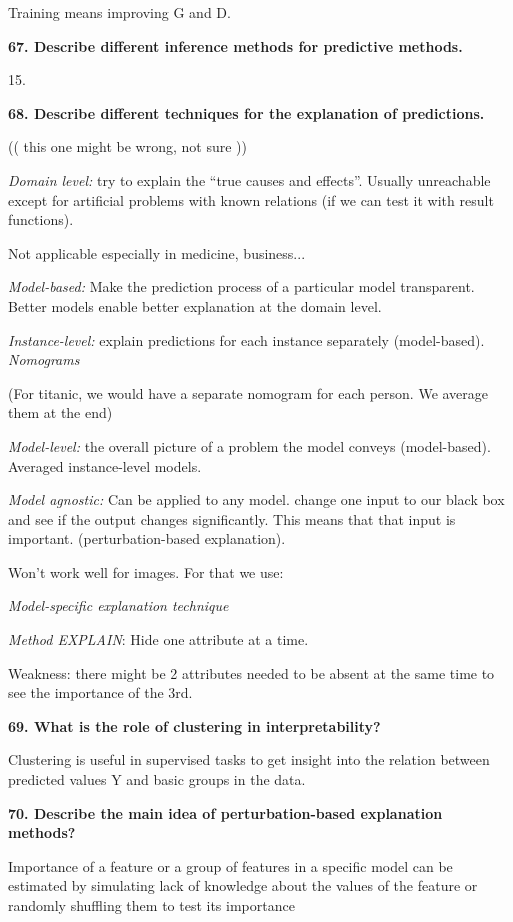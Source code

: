 Training means improving G and D.

\textbf{67. Describe different inference methods for predictive
methods.}

15.

\textbf{68. Describe different techniques for the explanation of
predictions.}

(( this one might be wrong, not sure ))

\textit{Domain level:} try to explain the ``true causes and
effects''. Usually unreachable except for artificial problems with known
relations (if we can test it with result functions).

Not applicable especially in medicine, business...

\textit{Model-based:} Make the prediction process of a particular
model transparent. Better models enable better explanation at the domain
level.

\textit{Instance-level:} explain predictions for each instance
separately (model-based). \emph{Nomograms}

(For titanic, we would have a separate nomogram for each person. We
average them at the end)

\textit{Model-level:} the overall picture of a problem the model
conveys (model-based). Averaged instance-level models.

\textit{Model agnostic:} Can be applied to any model. change one
input to our black box and see if the output changes significantly. This
means that that input is important. (perturbation-based explanation).

Won't work well for images. For that we use:

\textit{Model-specific explanation technique}

\textit{Method EXPLAIN}: Hide one attribute at a time.

Weakness: there might be 2 attributes needed to be absent at the same
time to see the importance of the 3rd.

\textbf{69. What is the role of clustering in interpretability?}

Clustering is useful in supervised tasks to get insight into the
relation between predicted values Y and basic groups in the data.

\textbf{70. Describe the main idea of perturbation-based explanation
methods?}

Importance of a feature or a group of features in a specific model can
be estimated by simulating lack of knowledge about the values of the
feature or randomly shuffling them to test its importance


